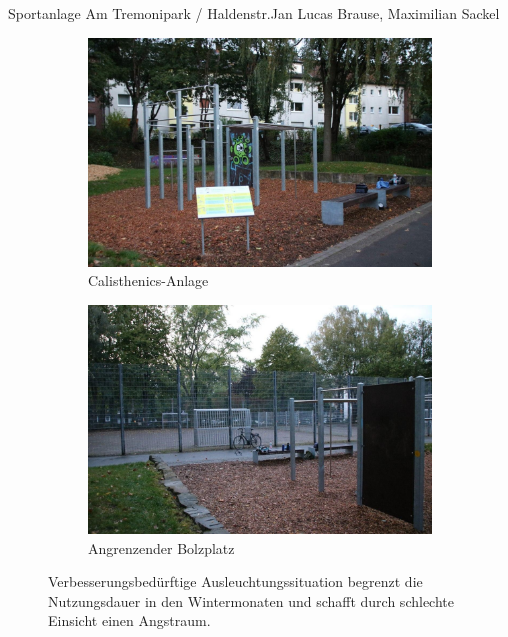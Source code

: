 \documentclass{../../templates/amendment}
\begin{document}
\begin{boxed}{Sportanlage Am Tremonipark / Haldenstr.}{Jan Lucas Brause, Maximilian Sackel}
    \begin{figure}[htpb]
        \centering
        \begin{subfigure}[]{0.49\textwidth}
            \begin{center}
                \includegraphics[width=\linewidth]{pictures/photo1.jpg}
                \caption{Calisthenics-Anlage}%
            \end{center}
        \end{subfigure}
        \begin{subfigure}[]{0.49\textwidth}
            \begin{center}
                \includegraphics[width=\linewidth]{pictures/photo3.jpg}
                \caption{Angrenzender Bolzplatz}%
            \end{center}
        \end{subfigure}
        \caption{Verbesserungsbedürftige Ausleuchtungssituation begrenzt die
            Nutzungsdauer in den Wintermonaten und schafft durch schlechte Einsicht
        einen Angstraum.}
    \end{figure}


\end{boxed}
\end{document}
